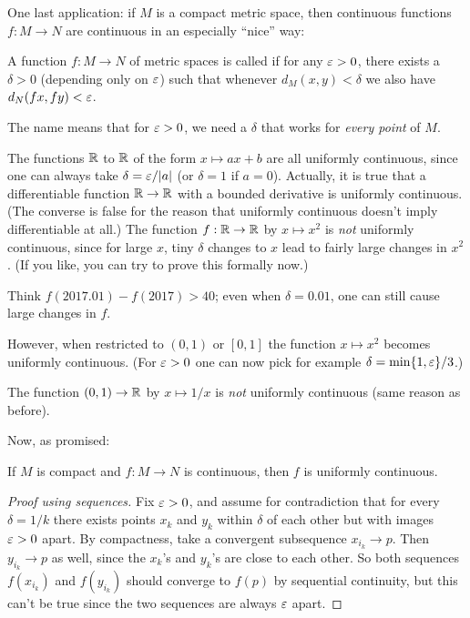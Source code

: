 One last application: if $M$ is a compact metric space,
then continuous functions $f : M \to N$
are continuous in an especially ``nice'' way:
\begin{definition}
	A function $f : M \to N$ of metric spaces
	is called 
	if for any $\varepsilon > 0$, there exists a $\delta > 0$
	(depending only on $\varepsilon$) such that
	whenever $d_M(x,y) < \delta$ we also have $d_N(fx, fy) < \varepsilon$.
\end{definition}
The name means that for $\varepsilon > 0$,
we need a $\delta$ that works for \emph{every point} of $M$.
\begin{example}
	\listhack
	\begin{enumerate}[(a)]
		\ii The functions $\mathbb R$ to $\mathbb R$ of the form
		$x \mapsto ax+b$ are all uniformly continuous,
		since one can always take $\delta = \varepsilon/|a|$ (or $\delta=1$ if $a=0$).
		\ii Actually, it is true that a differentiable function $\mathbb R \to \mathbb R$
		with a bounded derivative is uniformly continuous.
		(The converse is false for the reason that uniformly continuous
		doesn't imply differentiable at all.)
		\ii The function $f : \mathbb R \to \mathbb R$ by $x \mapsto x^2$
		is \emph{not} uniformly continuous, since for large $x$,
		tiny $\delta$ changes to $x$ lead to fairly large changes in $x^2$.
		(If you like, you can try to prove this formally now.)

		Think $f(2017.01) - f(2017) > 40$;
		even when $\delta = 0.01$, one can still cause large changes in $f$.

		\ii However, when restricted to $(0,1)$ or $[0,1]$
		the function $x \mapsto x^2$ becomes uniformly continuous.
		(For $\varepsilon > 0$ one can now pick for example $\delta = \min\{1,\varepsilon\}/3$.)

		\ii The function $(0,1) \to \mathbb R$ by $x \mapsto 1/x$ is \emph{not}
		uniformly continuous (same reason as before).
	\end{enumerate}
\end{example}

Now, as promised:
\begin{proposition}
	If $M$ is compact and $f \colon M \to N$ is continuous,
	then $f$ is uniformly continuous.
\end{proposition}
\begin{proof}[Proof using sequences]
	Fix $\varepsilon > 0$, and assume for contradiction that for every $\delta = 1/k$
	there exists points $x_k$ and $y_k$ within $\delta$ of each
	other but with images $\varepsilon > 0$ apart.
	By compactness, take a convergent subsequence $x_{i_k} \to p$.
	Then $y_{i_k} \to p$ as well, since the $x_k$'s and $y_k$'s are close to each other.
	So both sequences $f(x_{i_k})$ and $f(y_{i_k})$ should converge to $f(p)$ by sequential continuity,
	but this can't be true since the two sequences are always $\varepsilon$ apart.
\end{proof}

